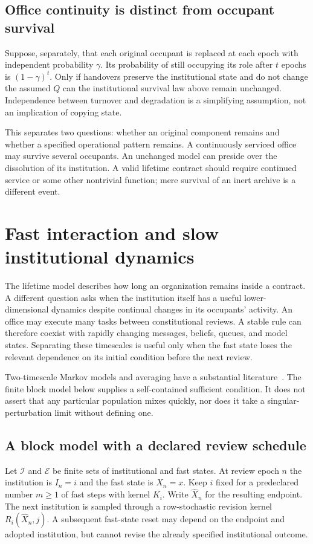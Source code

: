 \subsection{Office continuity is distinct from occupant survival}
Suppose, separately, that each original occupant is replaced at each epoch with independent probability $\gamma$. Its probability of still occupying its role after $t$ epochs is $(1-\gamma)^t$. Only if handovers preserve the institutional state and do not change the assumed $Q$ can the institutional survival law above remain unchanged. Independence between turnover and degradation is a simplifying assumption, not an implication of copying state.

This separates two questions: whether an original component remains and whether a specified operational pattern remains. A continuously serviced office may survive several occupants. An unchanged model can preside over the dissolution of its institution. A valid lifetime contract should require continued service or some other nontrivial function; mere survival of an inert archive is a different event.

\section{Fast interaction and slow institutional dynamics}\label{MS:sec:multiscale}

The lifetime model describes how long an organization remains inside a contract. A different question asks when the institution itself has a useful lower-dimensional dynamics despite continual changes in its occupants' activity. An office may execute many tasks between constitutional reviews. A stable rule can therefore coexist with rapidly changing messages, beliefs, queues, and model states. Separating these timescales is useful only when the fast state loses the relevant dependence on its initial condition before the next review.

Two-timescale Markov models and averaging have a substantial literature~\cite{MS:yinzhang}. The finite block model below supplies a self-contained sufficient condition. It does not assert that any particular population mixes quickly, nor does it take a singular-perturbation limit without defining one.

\subsection{A block model with a declared review schedule}
Let $\mathcal I$ and $\mathcal E$ be finite sets of institutional and fast states. At review epoch $n$ the institution is $I_n=i$ and the fast state is $X_n=x$. Keep $i$ fixed for a predeclared number $m\geq1$ of fast steps with kernel $K_i$. Write $\widehat X_n$ for the resulting endpoint. The next institution is sampled through a row-stochastic revision kernel $R_i(\widehat X_n,j)$. A subsequent fast-state reset may depend on the endpoint and adopted institution, but cannot revise the already specified institutional outcome.

